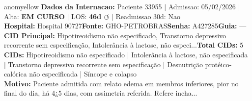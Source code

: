 \documentclass[a4paper,10pt]{article}
\begin{document}
\begin{anomalycard}[Internacao 164491 | GHO-PETROBRAS | MODERADO (z=2.49)]{anomyellow}
\textbf{Dados da Internacao:} Paciente 33955 $\mid$ Admissao: 05/02/2026 $\mid$ Alta: \textcolor{anomorange}{\textbf{EM CURSO}} $\mid$ LOS: \textbf{46d \textcolor{anomorange}{$\circlearrowleft$}} $\mid$ Readmissao 30d: Nao\\
\textbf{Hospital:} Hospital 90727\quad\textbf{Fonte:} GHO-PETROBRAS\quad\textbf{Senha:} A427285\quad\textbf{Guia:} ---\\
\textbf{CID Principal:} {\small Hipotireoidismo não especificado, Transtorno depressivo recorrente sem especificação, Intolerância à lactose, não especi...}\quad\textbf{Total CIDs:} 5\\

\textbf{CIDs:} {\scriptsize Hipotireoidismo não especificado | Intolerância à lactose, não especificada | Transtorno depressivo recorrente sem especificação | Desnutrição protéico-calórica não especificada | Síncope e colapso}\\

\textbf{Motivo:} {\scriptsize Paciente admitida com relato edema em membros inferiores, pior no final do dia, há 4¿5 dias, com assimetria referida. Refere incha...}\\


\end{anomalycard}
\end{document}
